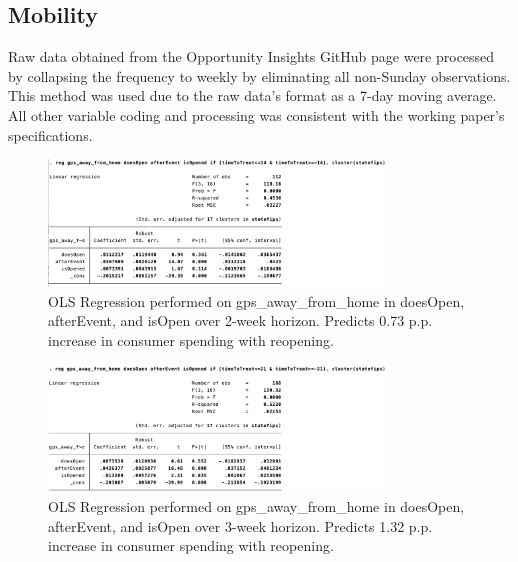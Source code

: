 \documentclass[12pt,letterpaper]{article}
\begin{document}
      \subsection{Mobility}
        Raw data obtained from the Opportunity Insights GitHub page were processed by collapsing the frequency to weekly by eliminating all non-Sunday observations.  This method was used due to the raw data’s format as a 7-day moving average.  All other variable coding and processing was consistent with the working paper’s specifications.
        \begin{figure}[!ht]
          \centering
          \includegraphics[width=0.8\textwidth]{figures/gps_2wk.png}
          \caption{OLS Regression performed on gps\_away\_from\_home in doesOpen, afterEvent, and isOpen over 2-week horizon.  Predicts 0.73 p.p. increase in consumer spending with reopening.}
          \label{fig:figures-gps_2wk-png}
        \end{figure}
        \begin{figure}[!ht]
          \centering
          \includegraphics[width=0.8\textwidth]{figures/gps_3wk.png}
          \caption{OLS Regression performed on gps\_away\_from\_home in doesOpen, afterEvent, and isOpen over 3-week horizon.  Predicts 1.32 p.p. increase in consumer spending with reopening.}
          \label{fig:figures-gps_3wk-png}
        \end{figure}  
\end{document}
